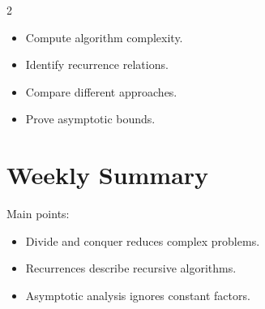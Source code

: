 \documentclass[a4paper,9pt]{extarticle}
\begin{document}
\begin{multicols}{2}
\begin{summary}


\begin{itemize}

\item Compute algorithm complexity.

\item Identify recurrence relations.

\item Compare different approaches.

\item Prove asymptotic bounds.

\end{itemize}


\end{summary}



\section{Weekly Summary}


\begin{important}

Main points:

\begin{itemize}

\item Divide and conquer reduces complex problems.

\item Recurrences describe recursive algorithms.

\item Asymptotic analysis ignores constant factors.

\end{itemize}

\end{important}



\end{multicols}
\end{document}
